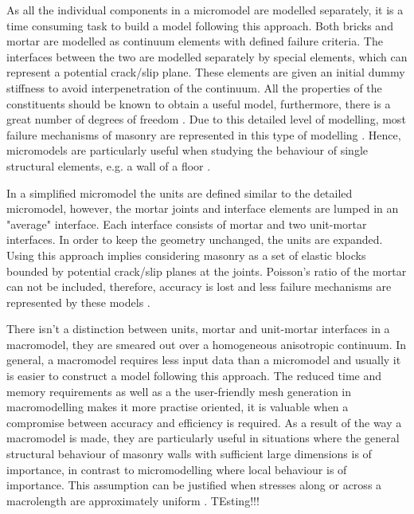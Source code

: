 As all the individual components in a micromodel are modelled separately, it is a time consuming task to build a model following this approach. Both bricks and mortar are modelled as continuum elements with defined failure criteria. The interfaces between the two are modelled separately by special elements, which can represent a potential crack/slip plane. These elements are given an initial dummy stiffness to avoid interpenetration of the continuum. All the properties of the constituents should be known to obtain a useful model, furthermore, there is a great number of degrees of freedom \cite{Mersch2015}. Due to this detailed level of modelling, most failure mechanisms of masonry are represented in this type of modelling \cite{barraza2012numerical}. Hence, micromodels are particularly useful when studying the behaviour of single structural elements, e.g. a wall of a floor \cite{Mersch2015}.

In a simplified micromodel the units are defined similar to the detailed micromodel, however, the mortar joints and interface elements are lumped in an "average" interface. Each interface consists of mortar and two unit-mortar interfaces. In order to keep the geometry unchanged, the units are expanded. Using this approach implies considering masonry as a set of elastic blocks bounded by potential crack/slip planes at the joints. Poisson's ratio of the mortar can not be included, therefore, accuracy is lost and less failure mechanisms are represented by these models \cite{lourenco1996}.

There isn't a distinction between units, mortar and unit-mortar interfaces in a macromodel, they are smeared out over a homogeneous anisotropic continuum. In general, a macromodel requires less input data than a micromodel and usually it is easier to construct a model following this approach. The reduced time and memory requirements as well as a the user-friendly mesh generation in macromodelling makes it more practise oriented, it is valuable when a compromise between accuracy and efficiency is required. As a result of the way a macromodel is made, they are particularly useful in situations where the general structural behaviour of masonry walls with sufficient large dimensions is of importance, in contrast to micromodelling where local behaviour is of importance. This assumption can be justified when stresses along or across a macrolength are approximately uniform \cite{lourenco1996}.  
\cite{massart2003}
TEsting!!!
